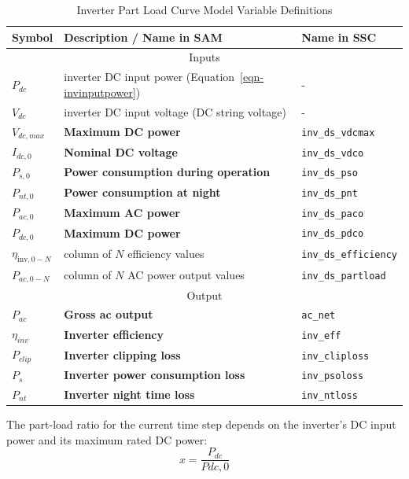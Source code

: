 \documentclass[12pt,letterpaper]{article}
\begin{document}
\begin{table}
\begin{center}
\caption{Inverter Part Load Curve Model Variable Definitions}
\begin{tabular}{lll}
\midrule
Symbol & Description / \textbf{Name in SAM} & Name in SSC \\
\midrule
\multicolumn{3}{c}{Inputs}\\
$P_{dc}$ & inverter DC input power (Equation~\ref{eqn-invinputpower}) & - \\
$V_{dc}$ & inverter DC input voltage (DC string voltage) & - \\
$V_{dc,max}$ & \textbf{Maximum DC power} & \texttt{inv\_ds\_vdcmax} \\
$I_{dc,0}$ & \textbf{Nominal DC voltage} & \texttt{inv\_ds\_vdco} \\
$P_{s,0}$ & \textbf{Power consumption during operation} & \texttt{inv\_ds\_pso} \\
$P_{nt,0}$ & \textbf{Power consumption at night} & \texttt{inv\_ds\_pnt} \\
$P_{ac,0}$ & \textbf{Maximum AC power} & \texttt{inv\_ds\_paco} \\
$P_{dc,0}$ & \textbf{Maximum DC power} & \texttt{inv\_ds\_pdco} \\
$\eta_{\mathrm{inv},0-N}$ & column of $N$ efficiency values & \texttt{inv\_ds\_efficiency} \\
$P_{ac,0-N}$ & column of $N$ AC power output values & \texttt{inv\_ds\_partload} \\
\midrule
\multicolumn{3}{c}{Output}\\
$P_{ac}$ & \textbf{Gross ac output} & \texttt{ac\_net} \\
$\eta_{inv}$ & \textbf{Inverter efficiency} & \texttt{inv\_eff}  \\
$P_{clip}$ & \textbf{Inverter clipping loss} & \texttt{inv\_cliploss}  \\
$P_{s}$ & \textbf{Inverter power consumption loss}& \texttt{inv\_psoloss}  \\
$P_{nt}$ & \textbf{Inverter night time loss}& \texttt{inv\_ntloss}  \\
\hline
\end{tabular}
\label{tab-partloadinvertervars}
\end{center}
\end{table}

The part-load ratio for the current time step depends on the inverter's DC input power and its maximum rated DC power:
\begin{equation}
x = \frac{P_{dc}}{P{dc,0}}
\end{equation}
\end{document}
